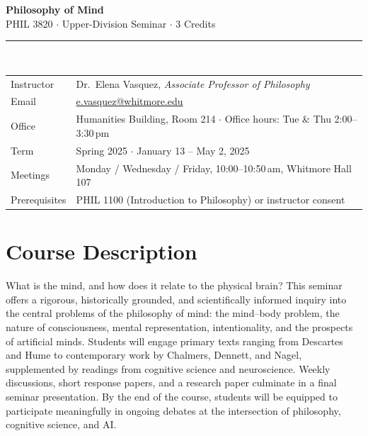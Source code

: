\documentclass[11pt, a4paper]{article}
\newcommand{\accentrule}{%
  {\color{accent}\rule{\linewidth}{1.8pt}}%
}
\begin{document}
\begin{center}
  {\fontsize{22}{26}\selectfont\bfseries\color{accent}
    Philosophy of Mind}\\[4pt]
  {\large\color{muted} PHIL 3820 $\cdot$ Upper-Division Seminar $\cdot$ 3 Credits}\\[10pt]
  \accentrule\\[10pt]
  \begin{tabularx}{\linewidth}{@{}K@{\hspace{8mm}}>{\raggedright\arraybackslash}X@{}}
    Instructor    & Dr.\ Elena Vasquez, \textit{Associate Professor of Philosophy} \\
    Email         & \href{mailto:e.vasquez@whitmore.edu}{e.vasquez@whitmore.edu} \\
    Office        & Humanities Building, Room 214 $\cdot$ Office hours: Tue \& Thu 2:00–3:30\,pm \\
    Term          & Spring 2025 $\cdot$ January 13 – May 2, 2025 \\
    Meetings      & Monday / Wednesday / Friday, 10:00–10:50\,am, Whitmore Hall 107 \\
    Prerequisites & PHIL 1100 (Introduction to Philosophy) or instructor consent \\
  \end{tabularx}
\end{center}

\vspace{6pt}

\section{Course Description}

What is the mind, and how does it relate to the physical brain? This seminar offers a
rigorous, historically grounded, and scientifically informed inquiry into the central problems
of the philosophy of mind: the mind–body problem, the nature of consciousness, mental
representation, intentionality, and the prospects of artificial minds. Students will engage
primary texts ranging from Descartes and Hume to contemporary work by Chalmers, Dennett,
and Nagel, supplemented by readings from cognitive science and neuroscience. Weekly
discussions, short response papers, and a research paper culminate in a final seminar
presentation. By the end of the course, students will be equipped to participate meaningfully
in ongoing debates at the intersection of philosophy, cognitive science, and AI.
\end{document}
